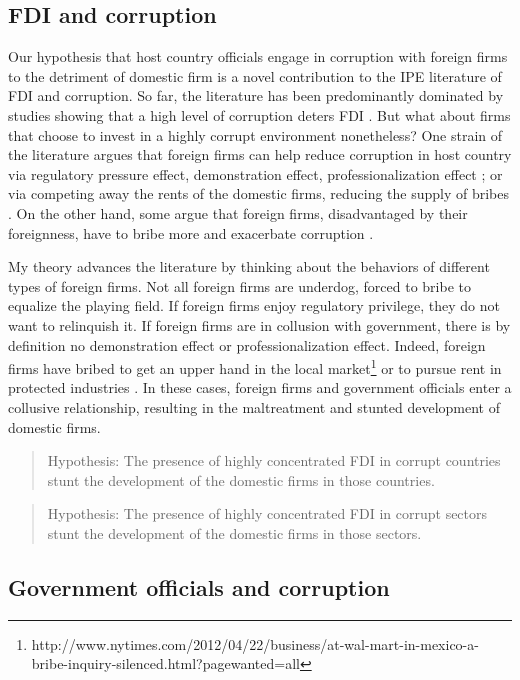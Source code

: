 \documentclass[12pt]{article}
\begin{document}
\subsection{FDI and corruption}

Our hypothesis that host country officials engage in corruption with foreign firms to the detriment of domestic firm is a novel contribution to the IPE literature of FDI and corruption. So far, the literature has been predominantly dominated by studies showing that a high level of corruption deters FDI \citep{Wei2000, Hakkala2008, Al-Sadig2009}. But what about firms that choose to invest in a highly corrupt environment nonetheless? One strain of the literature argues that foreign firms can help reduce corruption in host country via regulatory pressure effect, demonstration effect, professionalization effect \citep{Kwok2006}; or via competing away the rents of the domestic firms, reducing the supply of bribes \citep{Sandholtz2003}. On the other hand, some argue that foreign firms, disadvantaged by their foreignness, have to bribe more and exacerbate corruption \citep{Hellman2002}.

My theory advances the literature by thinking about the behaviors of different types of foreign firms. Not all foreign firms are underdog, forced to bribe to equalize the playing field. If foreign firms enjoy regulatory privilege, they do not want to relinquish it. If foreign firms are in collusion with government, there is by definition no demonstration effect or professionalization effect. Indeed, foreign firms have bribed to get an upper hand in the local market\footnote{http://www.nytimes.com/2012/04/22/business/at-wal-mart-in-mexico-a-bribe-inquiry-silenced.html?pagewanted=all} or to pursue rent in protected industries \citep{Malesky2015}. In these cases, foreign firms and government officials enter a collusive relationship, resulting in the maltreatment and stunted development of domestic firms.

\begin{quote}
Hypothesis: The presence of highly concentrated FDI in corrupt countries stunt the development of the domestic firms in those countries.
\end{quote}

\begin{quote}
Hypothesis: The presence of highly concentrated FDI in corrupt sectors stunt the development of the domestic firms in those sectors.
\end{quote}

\subsection{Government officials and corruption}
\end{document}
